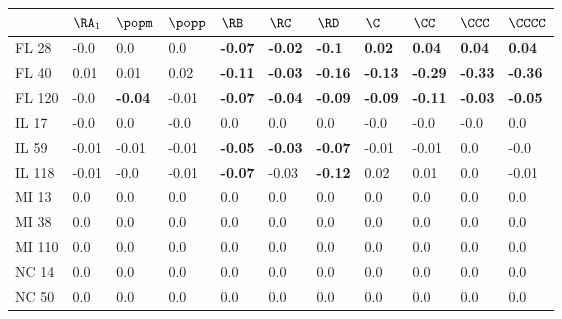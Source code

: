\begin{tabular}{lllllllllll}
\toprule
{} & $\RA_1$ &         $\popm$ & $\popp$ &           $\RB$ &           $\RC$ &           $\RD$ &            $\C$ &           $\CC$ &          $\CCC$ &         $\CCCC$ \\
\midrule
FL 28   &    -0.0 &             0.0 &     0.0 &  \textbf{-0.07} &  \textbf{-0.02} &   \textbf{-0.1} &   \textbf{0.02} &   \textbf{0.04} &   \textbf{0.04} &   \textbf{0.04} \\
FL 40   &    0.01 &            0.01 &    0.02 &  \textbf{-0.11} &  \textbf{-0.03} &  \textbf{-0.16} &  \textbf{-0.13} &  \textbf{-0.29} &  \textbf{-0.33} &  \textbf{-0.36} \\
FL 120  &    -0.0 &  \textbf{-0.04} &   -0.01 &  \textbf{-0.07} &  \textbf{-0.04} &  \textbf{-0.09} &  \textbf{-0.09} &  \textbf{-0.11} &  \textbf{-0.03} &  \textbf{-0.05} \\
IL 17   &    -0.0 &             0.0 &    -0.0 &             0.0 &             0.0 &             0.0 &            -0.0 &            -0.0 &            -0.0 &             0.0 \\
IL 59   &   -0.01 &           -0.01 &   -0.01 &  \textbf{-0.05} &  \textbf{-0.03} &  \textbf{-0.07} &           -0.01 &           -0.01 &             0.0 &            -0.0 \\
IL 118  &   -0.01 &            -0.0 &   -0.01 &  \textbf{-0.07} &           -0.03 &  \textbf{-0.12} &            0.02 &            0.01 &             0.0 &           -0.01 \\
MI 13   &     0.0 &             0.0 &     0.0 &             0.0 &             0.0 &             0.0 &             0.0 &             0.0 &             0.0 &             0.0 \\
MI 38   &     0.0 &             0.0 &     0.0 &             0.0 &             0.0 &             0.0 &             0.0 &             0.0 &             0.0 &             0.0 \\
MI 110  &     0.0 &             0.0 &     0.0 &             0.0 &             0.0 &             0.0 &             0.0 &             0.0 &             0.0 &             0.0 \\
NC 14   &     0.0 &             0.0 &     0.0 &             0.0 &             0.0 &             0.0 &             0.0 &             0.0 &             0.0 &             0.0 \\
NC 50   &     0.0 &             0.0 &     0.0 &             0.0 &             0.0 &             0.0 &             0.0 &             0.0 &             0.0 &             0.0 \\

\end{tabular}
